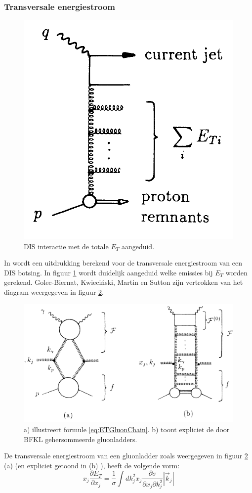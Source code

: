 \documentclass[a4paper,11pt]{article}
\numberwithin{equation}{section} %
\begin{document}
      \subsubsection{Transversale energiestroom}
\begin{figure} [H]
  \begin{center}
    \includegraphics[width=.33\textwidth]{Afbeeldingen/ETDefinitionDiagram.png}
    \caption{DIS interactie met de totale $E_T$ aangeduid. \cite{ET}}
   \label{fig:ETDefinitionDiagram}
  \end{center}
\end{figure}
In \cite{ET} wordt een uitdrukking berekend voor de transversale energiestroom van een DIS botsing.
In figuur \ref{fig:ETDefinitionDiagram} wordt duidelijk aangeduid welke emissies bij $E_T$ worden gerekend.
Golec-Biernat, Kwieciński, Martin en Sutton zijn vertrokken van het diagram weergegeven in figuur \ref{fig:ETDiagram}.
\begin{figure} [H]
  \begin{center}
    \includegraphics[width=.66\textwidth]{Afbeeldingen/ETDiagram.png}
    \caption{a) illustreert formule \eqref{eq:ETGluonChain}. b) toont expliciet de door BFKL gehersommeerde gluonladders. \cite{ET}}
   \label{fig:ETDiagram}
  \end{center}
\end{figure}
De transversale energiestroom van een gluonladder zoals weergegeven in figuur \ref{fig:ETDiagram} (a) (en expliciet getoond in (b) ), heeft de volgende vorm:
\begin{equation} \label{eq:ETGluonChain}
x_j \frac{\partial E_T}{\partial x_j} = \frac{1}{\sigma} \int dk_j^2 x_j \frac{\partial \sigma}{\partial x_j \partial k_j^2} |\vec{k}_j|
\end{equation}
\end{document}
